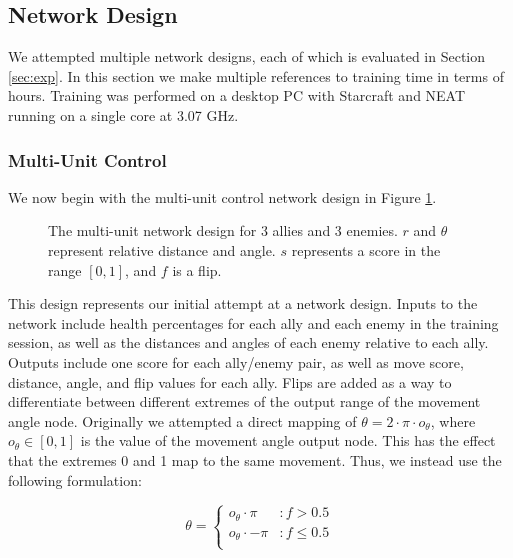 \documentclass[a4paper]{article}
\begin{document}
\subsection{Network Design}
\label{sec:net_design}

We attempted multiple network designs, each of which is evaluated in Section \ref{sec:exp}. In this section we make multiple references to training time in terms of hours. Training was performed on a desktop PC with Starcraft and NEAT running on a single core at 3.07 GHz. 

\subsubsection{Multi-Unit Control}
\label{sec:multiunit_design}

We now begin with the multi-unit control network design in Figure \ref{fig:design_multiunit}.

\begin{figure}

\caption{The multi-unit network design for 3 allies and 3 enemies. $r$ and $\theta$ represent relative distance and angle. $s$ represents a score in the range $[0,1]$, and $f$ is a flip.}
\label{fig:design_multiunit}
\end{figure}

This design represents our initial attempt at a network design. Inputs to the network include health percentages for each ally and each enemy in the training session, as well as the distances and angles of each enemy relative to each ally. Outputs include one score for each ally/enemy pair, as well as move score, distance, angle, and flip values for each ally. Flips are added as a way to differentiate between different extremes of the output range of the movement angle node. Originally we attempted a direct mapping of $\theta = 2 \cdot \pi \cdot o_\theta$, where $o_\theta \in [0,1]$ is the value of the movement angle output node. This has the effect that the extremes 0 and 1 map to the same movement. Thus, we instead use the following formulation:

 \begin{displaymath}
   \theta = \left\{
     \begin{array}{lr}
       o_\theta \cdot \pi & : f > 0.5\\
       o_\theta \cdot -\pi & : f \leq 0.5\\
     \end{array}
   \right.
\end{displaymath}
\end{document}
